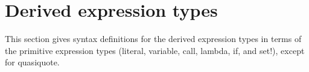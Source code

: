 \section{Derived expression types}
\label{derivedsection}

This section gives syntax definitions for the derived expression types in
terms of the primitive expression types (literal, variable, call, {\cf lambda},
{\cf if}, and {\cf set!}), except for {\cf quasiquote}.

